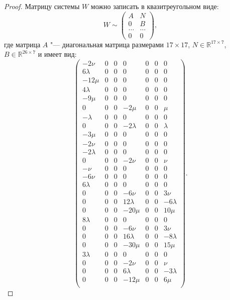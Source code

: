 \documentclass[../main.tex]{subfiles}
\begin{document}
\begin{proof}
Матрицу системы $W$ можно записать в квазитреугольном виде:
\begin{equation*}
W \sim
\begin{pmatrix}
A & N \\
0 & B \\
\hdots & \hdots  \\
0 & 0
\end{pmatrix},
\end{equation*}
где матрица $A$ "--- диагональная матрица размерами $17\times17$, $N\in \mathbb{R}^{17\times7}$, $B \in \mathbb{R}^{26\times7}$ и имеет вид:
\begin{equation}\label{eq:matrix_big}
\left(
\begin{array}{ccccccc}
 -2 \nu  & 0 & 0 & 0 & 0 & 0 & 0 \\
 6 \lambda  & 0 & 0 & 0 & 0 & 0 & 0 \\
 -12 \mu  & 0 & 0 & 0 & 0 & 0 & 0 \\
 4 \lambda  & 0 & 0 & 0 & 0 & 0 & 0 \\
 -9 \mu  & 0 & 0 & 0 & 0 & 0 & 0 \\
 0 & 0 & 0 & -2 \mu  & 0 & 0 & \mu  \\
 -\lambda  & 0 & 0 & 0 & 0 & 0 & 0 \\
 0 & 0 & 0 & -2 \lambda  & 0 & 0 & \lambda  \\
 -3 \mu  & 0 & 0 & 0 & 0 & 0 & 0 \\
 -2 \nu  & 0 & 0 & 0 & 0 & 0 & 0 \\
 -2 \lambda  & 0 & 0 & 0 & 0 & 0 & 0 \\
 0 & 0 & 0 & -2 \nu  & 0 & 0 & \nu  \\
 -\nu  & 0 & 0 & 0 & 0 & 0 & 0 \\
 -6 \nu  & 0 & 0 & 0 & 0 & 0 & 0 \\
 6 \lambda  & 0 & 0 & 0 & 0 & 0 & 0 \\
 0 & 0 & 0 & -6 \nu  & 0 & 0 & 3 \nu  \\
 0 & 0 & 0 & 12 \lambda  & 0 & 0 & -6 \lambda  \\
 0 & 0 & 0 & -20 \mu  & 0 & 0 & 10 \mu  \\
 8 \lambda  & 0 & 0 & 0 & 0 & 0 & 0 \\
 0 & 0 & 0 & -6 \nu  & 0 & 0 & 3 \nu  \\
 0 & 0 & 0 & 16 \lambda  & 0 & 0 & -8 \lambda  \\
 0 & 0 & 0 & -30 \mu  & 0 & 0 & 15 \mu  \\
 3 \lambda  & 0 & 0 & 0 & 0 & 0 & 0 \\
 0 & 0 & 0 & -2 \nu  & 0 & 0 & \nu  \\
 0 & 0 & 0 & 6 \lambda  & 0 & 0 & -3 \lambda  \\
 0 & 0 & 0 & -12 \mu  & 0 & 0 & 6 \mu  \\
\end{array}
\right).
\end{equation}


\end{proof}
\end{document}
